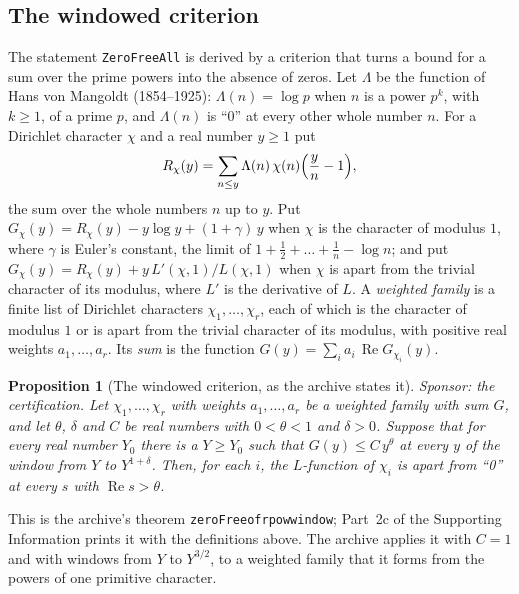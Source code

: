 \documentclass[11pt]{article}
\newtheorem{proposition}[theorem]{Proposition}
\theoremstyle{definition}
\theoremstyle{remark}
\newcommand{\re}{\operatorname{Re}}
\DeclareRobustCommand{\lean}[1]{{\renewcommand{\_}{\textunderscore\allowbreak}\texttt{#1}}}
\begin{document}
\subsection{The windowed criterion}

The statement \lean{ZeroFreeAll} is derived by a criterion that turns a bound for a sum over the prime powers into the absence of zeros. Let $\Lambda$ be the function of Hans von Mangoldt (1854--1925): $\Lambda(n)=\log p$ when $n$ is a power $p^{k}$, with $k\ge1$, of a prime $p$, and $\Lambda(n)$ is ``0'' at every other whole number $n$. For a Dirichlet character $\chi$ and a real number $y\ge1$ put
\[
R_\chi(y)=\sum_{n\le y}\Lambda(n)\,\chi(n)\Bigl(\frac yn-1\Bigr),
\]
the sum over the whole numbers $n$ up to $y$. Put $G_\chi(y)=R_\chi(y)-y\log y+(1+\gamma)\,y$ when $\chi$ is the character of modulus $1$, where $\gamma$ is Euler's constant, the limit of $1+\tfrac12+\dots+\tfrac1n-\log n$; and put $G_\chi(y)=R_\chi(y)+y\,L'(\chi,1)/L(\chi,1)$ when $\chi$ is apart from the trivial character of its modulus, where $L'$ is the derivative of $L$. A \emph{weighted family} is a finite list of Dirichlet characters $\chi_1,\dots,\chi_r$, each of which is the character of modulus $1$ or is apart from the trivial character of its modulus, with positive real weights $a_1,\dots,a_r$. Its \emph{sum} is the function $G(y)=\sum_{i}a_i\,\re G_{\chi_i}(y)$.

\begin{proposition}[The windowed criterion, as the archive states it]\label{prop:window}
Sponsor: the certification. Let $\chi_1,\dots,\chi_r$ with weights $a_1,\dots,a_r$ be a weighted family with sum $G$, and let $\theta$, $\delta$ and $C$ be real numbers with $0<\theta<1$ and $\delta>0$. Suppose that for every real number $Y_0$ there is a $Y\ge Y_0$ such that $G(y)\le C\,y^{\theta}$ at every $y$ of the window from $Y$ to $Y^{1+\delta}$. Then, for each $i$, the $L$-function of $\chi_i$ is apart from ``0'' at every $s$ with $\re s>\theta$.
\end{proposition}

\noindent This is the archive's theorem \lean{zeroFree\_of\_rpow\_window}; Part~2c of the Supporting Information prints it with the definitions above. The archive applies it with $C=1$ and with windows from $Y$ to $Y^{3/2}$, to a weighted family that it forms from the powers of one primitive character.
\end{document}
